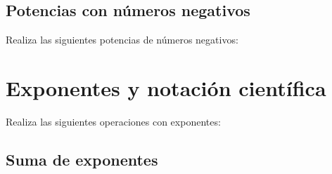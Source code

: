 \documentclass[12pt,addpoints,answers]{evalua}
\begin{document}
\begin{questions}
\begin{multicols}{2}
\begin{parts}
            \end{parts}
      \end{multicols}

      
	\subsection{Potencias con números negativos}

      \question[4] Realiza las siguientes potencias de números negativos:
     
      \begin{multicols}{2}
      \end{multicols}


	\section{Exponentes y notación científica}

      \question[6] Realiza las siguientes operaciones con exponentes:
   
      \begin{multicols}{3}
            \begin{parts}
                  
	\subsection{Suma de exponentes}


\end{parts}
\end{multicols}
\end{questions}
\end{document}
